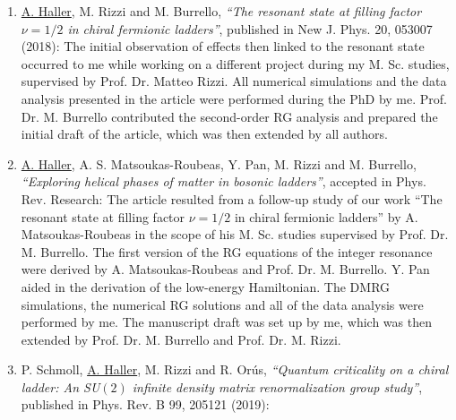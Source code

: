 \documentclass{svmono}
\providecommand{\DIFaddbegin}{} %
\providecommand{\DIFdelend}{} %
\newcommand{\DIFaddincludegraphics}[2][]{{\color{blue}\fbox{\DIFOincludegraphics[#1]{#2}}}} %
\DeclareRobustCommand{\DIFaddbegin}{\DIFOaddbegin \let\includegraphics\DIFaddincludegraphics} %
\DeclareRobustCommand{\DIFdelend}{\DIFOaddend \let\includegraphics\DIFOincludegraphics} %
\begin{document}
\begin{enumerate}
\DIFdelend \DIFaddbegin \item{\underline{A. Haller}, M. Rizzi and M. Burrello, {\it ``The resonant state at filling factor $\nu=1/2$ in chiral fermionic ladders''}, published in New J. Phys. 20, 053007 (2018): The initial observation of effects then linked to the resonant state occurred to me while working on a different project during my M. Sc. studies, supervised by Prof. Dr. Matteo Rizzi. All numerical simulations and the data analysis presented in the article were performed during the PhD by me. Prof. Dr. M. Burrello contributed the second-order RG analysis and prepared the initial draft of the article, which was then extended by all authors.}
    \item{\underline{A. Haller}, A. S. Matsoukas-Roubeas, Y. Pan, M. Rizzi and M. Burrello, {\it ``Exploring helical phases of matter in bosonic ladders''}, accepted in Phys. Rev. Research:
    The article resulted from a follow-up study of our work ``The resonant state at filling factor $\nu=1/2$ in chiral fermionic ladders'' by A. Matsoukas-Roubeas in the scope of his M. Sc. studies supervised by Prof. Dr. M. Burrello. The first version of the RG equations of the integer resonance were derived by A. Matsoukas-Roubeas and Prof. Dr. M. Burrello. Y. Pan aided in the derivation of the low-energy Hamiltonian. The DMRG simulations, the numerical RG solutions and all of the data analysis were performed by me. The manuscript draft was set up by me, which was then extended by Prof. Dr. M. Burrello and Prof. Dr. M. Rizzi.}
    \item{P. Schmoll, \underline{A. Haller}, M. Rizzi and R. Orús, {\it ``Quantum criticality on a chiral ladder: An SU$(2)$ infinite density matrix renormalization group study''}, published in Phys. Rev. B 99, 205121 (2019):
}
\end{enumerate}
\end{document}
